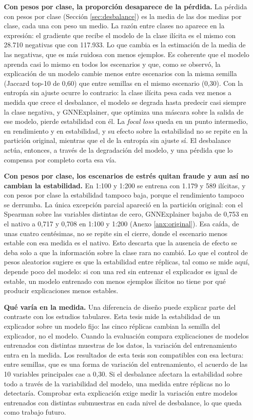 \textbf{Con pesos por clase, la proporción desaparece de la pérdida.} La pérdida con pesos por
clase (Sección \ref{sec:desbalance}) es la media de las dos medias por clase, cada una con peso
un medio. La razón entre clases no aparece en la expresión: el gradiente que recibe el modelo de
la clase ilícita es el mismo con 28.710 negativas que con 117.933. Lo que cambia es la
estimación de la media de las negativas, que es más ruidosa con menos ejemplos. Es coherente que
el modelo aprenda casi lo mismo en todos los escenarios y que, como se observó, la explicación
de un modelo cambie menos entre escenarios con la misma semilla (Jaccard top-10 de 0,60) que
entre semillas en el mismo escenario (0,30). Con la entropía sin ajuste ocurre lo contrario:
la clase ilícita pesa cada vez menos a medida que crece el desbalance, el modelo se degrada
hasta predecir casi siempre la clase negativa, y GNNExplainer, que optimiza una máscara sobre la
salida de ese modelo, pierde estabilidad con él. La \textit{focal loss} queda en un punto
intermedio, en rendimiento y en estabilidad, y su efecto sobre la estabilidad no se repite en la
partición original, mientras que el de la entropía sin ajuste sí. El desbalance actúa, entonces, a través de la
degradación del modelo, y una pérdida que lo compensa por completo corta esa vía.

\textbf{Con pesos por clase, los escenarios de estrés quitan fraude y aun así no cambian la
estabilidad.} En 1:100 y 1:200 se entrena con 1.179 y 589 ilícitas, y con pesos por clase la
estabilidad tampoco baja, porque el rendimiento tampoco se derrumba. La única excepción
parcial apareció en la partición original: con el Spearman sobre las variables distintas de
cero, GNNExplainer bajaba de 0,753 en el nativo a 0,717 y 0,708 en 1:100 y 1:200 (Anexo
\ref{anx:original}). Esa caída, de unas cuatro centésimas, no se repite sin el cierre, donde el
escenario menos estable con esa medida es el nativo. Esto descarta que la
ausencia de efecto se deba solo a que la información sobre la clase rara no cambió. Lo que el
control de pesos aleatorios sugiere es que la estabilidad entre réplicas, tal como se mide aquí,
depende poco del modelo: si con una red sin entrenar el explicador es igual de estable, un
modelo entrenado con menos ejemplos ilícitos no tiene por qué producir explicaciones menos
estables.

\textbf{Qué varía en la medida.} Una diferencia de diseño puede explicar parte del contraste con
los estudios tabulares. Esta tesis mide la estabilidad de un explicador sobre un modelo fijo:
las cinco réplicas cambian la semilla del explicador, no el modelo. Cuando la evaluación
compara explicaciones de modelos entrenados con distintas muestras de los datos, la variación
del entrenamiento entra en la medida. Los resultados de esta tesis son compatibles con esa
lectura: entre semillas, que es una forma de variación del entrenamiento, el acuerdo de las 10
variables principales cae a 0,30. Si el desbalance afectara la estabilidad sobre todo a través
de la variabilidad del modelo, una medida entre réplicas no lo detectaría. Comprobar esta
explicación exige medir la variación entre modelos entrenados con distintas submuestras en cada
nivel de desbalance, lo que queda como trabajo futuro.

